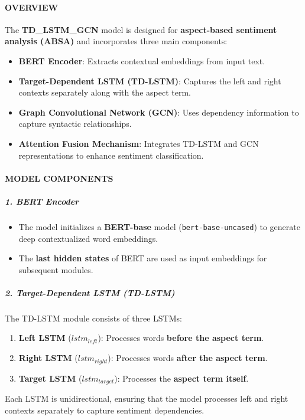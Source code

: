 \documentclass{article}
\begin{document}
\paragraph{OVERVIEW}
The \textbf{TD\_LSTM\_GCN} model is designed for \textbf{aspect-based sentiment analysis (ABSA)} and incorporates three main components:
\begin{itemize}
    \item \textbf{BERT Encoder}: Extracts contextual embeddings from input text.
    \item \textbf{Target-Dependent LSTM (TD-LSTM)}: Captures the left and right contexts separately along with the aspect term.
    \item \textbf{Graph Convolutional Network (GCN)}: Uses dependency information to capture syntactic relationships.
    \item \textbf{Attention Fusion Mechanism}: Integrates TD-LSTM and GCN representations to enhance sentiment classification.
\end{itemize}


\paragraph{MODEL COMPONENTS}

\subparagraph{1. BERT Encoder}
\begin{itemize}
    \item The model initializes a \textbf{BERT-base} model (\texttt{bert-base-uncased}) to generate deep contextualized word embeddings.
    \item The \textbf{last hidden states} of BERT are used as input embeddings for subsequent modules.
\end{itemize}

\subparagraph{2. Target-Dependent LSTM (TD-LSTM)}
The TD-LSTM module consists of three LSTMs:
\begin{enumerate}
    \item \textbf{Left LSTM} ($lstm_{left}$): Processes words \textbf{before the aspect term}.
    \item \textbf{Right LSTM} ($lstm_{right}$): Processes words \textbf{after the aspect term}.
    \item \textbf{Target LSTM} ($lstm_{target}$): Processes the \textbf{aspect term itself}.
\end{enumerate}
Each LSTM is unidirectional, ensuring that the model processes left and right contexts separately to capture sentiment dependencies.
\end{document}
